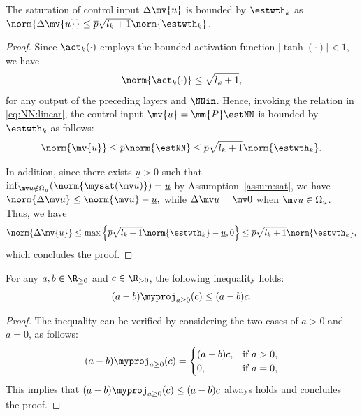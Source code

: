 \documentclass[letterpaper, journal]{IEEEtran}
\begin{document}
\begin{lem} \label{lem:delta:u:bound}
  The saturation of control input $\Delta\mv{u}$ is bounded by $\estwth_k$ as $\norm{\Delta\mv{u}}\le \overline{p}\sqrt{l_k+1}\norm{\estwth_k}$.
\end{lem}

\begin{proof}
  Since $\act_k(\cdot)$ employs the bounded activation function $\vert\tanh(\cdot)\vert < 1$, we have 
  \begin{equation}
    \norm{\act_k(\cdot)} \le \sqrt{l_k+1}
    ,
  \end{equation}
  for any output of the preceding layers and $\NNin$.
  Hence, invoking the relation in \eqref{eq:NN:linear}, the control input $\mv{u}=\mm{P}\estNN$ is bounded by $\estwth_k$ as follows:
  \begin{equation} \label{eq:NN:bound}
    \norm{\mv{u}} 
    \le
    \overline{p}
    \norm{\estNN}
    \le
    \overline{p}
    \sqrt{l_k+1}\norm{\estwth_k}
    .   
  \end{equation}

  In addition, since there exists $\underline{u}>0$ such that $\inf_{\mv u\notin\Omega_u}\allowbreak(\norm{\mysat(\mv u)})=\underline{u}$ by Assumption~\ref{assum:sat}, we have
  $
    \norm{\Delta\mv u}
    \le
    \norm{\mv u}-\underline{u}
    ,
  $ 
  while $\Delta\mv u=\mv 0$ when $\mv u\in\Omega_u$.
  Thus, we have
  \begin{equation}
    \norm{\Delta\mv{u}}
    \le
    \max
    \left\{
      \overline{p}\sqrt{l_k+1}\norm{\estwth_k}
      -
      \underline{u}
      ,
      0
    \right\}
    \le
    \overline{p}\sqrt{l_k+1}\norm{\estwth_k}
    ,  
  \end{equation}
  which concludes the proof.    
\end{proof}

\begin{lem} \label{lem:proj:ineq}
  For any $a,b\in\R_{\ge0}$ and $c\in\R_{>0}$, the following inequality holds:
  \begin{equation}
    (a-b)\myproj_{a\ge0}(c) \le (a-b) c.
  \end{equation}
\end{lem}

\begin{proof}
  The inequality can be verified by considering the two cases of $a>0$ and $a=0$, as follows:
  \begin{equation*}
    (a-b)\myproj_{a\ge0}(c) 
    =
    \begin{cases}
      (a-b) c, & \text{if } a>0,
      \\
      0, & \text{if } a=0,
    \end{cases}
  \end{equation*}
  This implies that $(a-b)\myproj_{a\ge0}(c) \le (a-b) c$ always holds and concludes the proof.
\end{proof}
\end{document}
